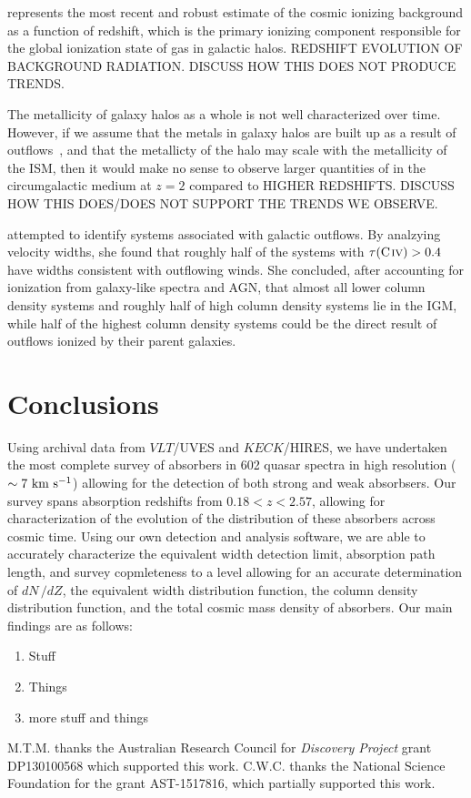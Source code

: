 \documentclass[linenumbers,twocolumn]{aastex61}
\begin{document}
\cite{Haardt2012} represents the most recent and robust estimate of the cosmic ionizing background as a function of redshift, which is the primary ionizing component responsible for the global ionization state of gas in galactic halos. REDSHIFT EVOLUTION OF BACKGROUND RADIATION. DISCUSS HOW THIS DOES NOT PRODUCE TRENDS.

The metallicity of galaxy halos as a whole is not well characterized over time. However, if we assume that the metals in galaxy halos are built up as a result of outflows~\citep{Quiret2016}, and that the metallicty of the halo may scale with the metallicity of the ISM, then it would make no sense to observe larger quantities of {\CIV} in the circumgalactic medium at $z = 2$ compared to HIGHER REDSHIFTS. DISCUSS HOW THIS DOES/DOES NOT SUPPORT THE TRENDS WE OBSERVE.

\cite{Songaila2006} attempted to identify {\CIV} systems associated with galactic outflows. By analzying velocity widths, she found that roughly half of the systems with $\tau(\hbox{{\rm C}\kern 0.1em{\sc iv}}) > 0.4$ have widths consistent with outflowing winds. She concluded, after accounting for ionization from galaxy-like spectra and AGN, that almost all lower column density systems and roughly half of high column density {\CIV} systems lie in the IGM, while half of the highest column density systems could be the direct result of outflows ionized by their parent galaxies.

\section{Conclusions}
\label{sec:conclusions}

Using archival data from $VLT$/UVES and $KECK$/HIRES, we have undertaken the most complete survey of {\CIV} absorbers in 602 quasar spectra in high resolution ($\sim 7~\mathrm{\hbox{km~s$^{-1}$}}$) allowing for the detection of both strong and weak {\CIV} absorbsers. Our survey spans absorption redshifts from $0.18 < z < 2.57$, allowing for characterization of the evolution of the distribution of these absorbers across cosmic time. Using our own detection and analysis software, we are able to accurately characterize the equivalent width detection limit, absorption path length, and survey copmleteness to a level allowing for an accurate determination of $dN\,/dZ$, the equivalent width distribution function, the column density distribution function, and the total cosmic mass density of {\CIV} absorbers. Our main findings are as follows:

\begin{enumerate}
\item Stuff
\item Things
\item more stuff and things
\end{enumerate}

M.T.M. thanks the Australian Research Council for \textsl{Discovery Project} grant DP130100568 which supported this work. C.W.C. thanks the National Science Foundation for the grant AST-1517816, which partially supported this work.



\end{document}
